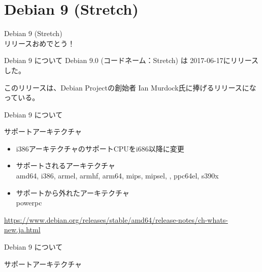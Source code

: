 
\section{Debian 9 (Stretch)}

\begin{frame}\begin{center}\Huge{Debian 9 (Stretch)\\リリースおめでとう！}\end{center}\end{frame}

\begin{frame}{Debian 9 について}%
  Debian 9.0 (コードネーム：Stretch) は 2017-06-17にリリースした。
  
  このリリースは、Debian Projectの創始者 Ian Murdock氏に捧げるリリースになっている。

  \begin{center}
  \end{center}
\end{frame}


\begin{frame}{Debian 9 について}%

サポートアーキテクチャ
\begin{itemize}
\item i386アーキテクチャのサポートCPUをi686以降に変更
\item サポートされるアーキテクチャ \\
  amd64, i386, armel, armhf, arm64, mips, mipsel, {\color{red}{mips64el}}, ppc64el, s390x
\item サポートから外れたアーキテクチャ \\
  powerpc
\end{itemize}

\small{\url{https://www.debian.org/releases/stable/amd64/release-notes/ch-whats-new.ja.html}}

\end{frame}


\begin{frame}{Debian 9 について}%

サポートアーキテクチャ
\begin{center}
\end{center}

\end{frame}

